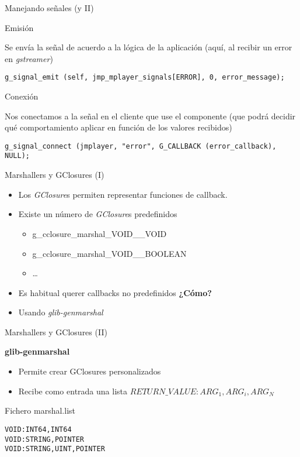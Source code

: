 \documentclass{beamer}
\begin{document}
\begin{frame}[fragile]{Manejando señales (y II)}
\begin{block}{Emisión}

\small{Se envía la señal de acuerdo a la lógica de la aplicación (aquí, al
recibir un error en {\it gstreamer})}

\scriptsize{
\begin{verbatim}
g_signal_emit (self, jmp_mplayer_signals[ERROR], 0, error_message);
\end{verbatim}
}
\end{block}
\begin{block}{Conexión}

\small{Nos conectamos a la señal en el cliente que use el componente (que podrá
decidir qué comportamiento aplicar en función de los valores recibidos)}

\scriptsize{
\begin{verbatim}
g_signal_connect (jmplayer, "error", G_CALLBACK (error_callback), NULL);
\end{verbatim}
}
\end{block}
\end{frame}

\begin{frame}{Marshallers y GClosures (I)}

\begin{itemize}
  \item Los {\it GClosure}s permiten representar funciones de callback.
  \item Existe un número de {\it GClosure}s predefinidos
  \begin{itemize}
    \item g\_cclosure\_marshal\_VOID\_\_VOID 
    \item g\_cclosure\_marshal\_VOID\_\_BOOLEAN
    \item \ldots
  \end{itemize}
  \item Es habitual querer callbacks no predefinidos
  \textbf{¿Cómo?}
  \item<3-> Usando {\it glib-genmarshal}
\end{itemize}

\end{frame}

\begin{frame}[fragile]{Marshallers y GClosures (II)}

\textbf{glib-genmarshal}

\begin{itemize}
  \item Permite crear GClosures personalizados
  \item Recibe como entrada una lista $RETURN\_VALUE:ARG_{1},ARG_{i},ARG_{N}$
\end{itemize}
\begin{block}{Fichero marshal.list}
\begin{verbatim}
VOID:INT64,INT64
VOID:STRING,POINTER
VOID:STRING,UINT,POINTER
\end{verbatim}
\end{block}
\end{frame}
\end{document}
